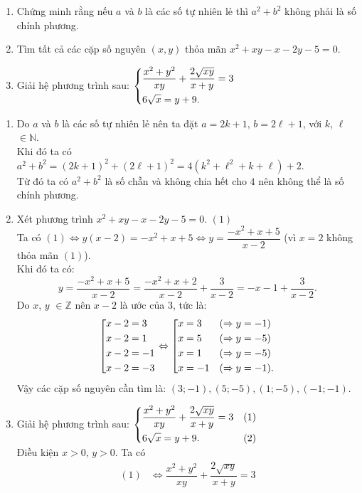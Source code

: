 \begin{ex}%
\hfill
    \begin{enumerate}    
        \item Chứng minh rằng nếu $a$ và $b$ là các số tự nhiên lẻ thì $a^2+b^2$ không phải là số chính phương.
        \item Tìm tất cả các cặp số nguyên $(x,y)$ thỏa mãn $x^2+xy-x-2y-5=0$.
        \item Giải hệ phương trình sau: $\left\{\begin{aligned}&\dfrac{x^2+y^2}{xy}+\dfrac{2\sqrt{xy}}{x+y}=3\\&6\sqrt{x}=y+9.\end{aligned}\right.$
    \end{enumerate}
\loigiai
    {\begin{enumerate}    
    		\item Do $a$ và $b$ là các số tự nhiên lẻ nên ta đặt $a=2k+1$, $b=2\ell+1$, với $k$, $\ell$ $\in\mathbb{N}$.\\
    		Khi đó ta có $a^2+b^2=(2k+1)^2+(2\ell+1)^2=4(k^2+\ell^2+k+\ell)+2$.\\
    		Từ đó ta có $a^2+b^2$ là số chẵn và không chia hết cho $4$ nên không thể là số chính phương.
    		\item Xét phương trình $x^2+xy-x-2y-5=0$. \hfill $(1)$\\
    		Ta có $(1)\Leftrightarrow y(x-2)=-x^2+x+5\Leftrightarrow y=\dfrac{-x^2+x+5}{x-2}$ (vì $x=2$ không thỏa mãn $(1)$).\\
    		Khi đó ta có: $$y=\dfrac{-x^2+x+5}{x-2}=\dfrac{-x^2+x+2}{x-2}+\dfrac{3}{x-2}=-x-1+\dfrac{3}{x-2}.$$
    		Do $x$, $y$ $\in\mathbb{Z}$ nên $x-2$ là ước của $3$, tức là:\\
    		$$\left[\begin{aligned}&x-2=3\\&x-2=1\\&x-2=-1\\&x-2=-3\end{aligned}\right.\Leftrightarrow\left[\begin{aligned}&x=3&&(\Rightarrow y=-1)\\&x=5&&(\Rightarrow y=-5)\\&x=1&&(\Rightarrow y=-5)\\&x=-1&&(\Rightarrow y=-1).\end{aligned}\right.$$
    		Vậy các cặp số nguyên cần tìm là: $(3; -1), (5; -5), (1; -5), (-1; -1)$.
    		\item Giải hệ phương trình sau: $\left\{\begin{aligned}&\dfrac{x^2+y^2}{xy}+\dfrac{2\sqrt{xy}}{x+y}=3&(1)\\&6\sqrt{x}=y+9.&(2)\end{aligned}\right.$\\
    		Điều kiện $x>0$, $y>0$.
    		Ta có
    		{\allowdisplaybreaks
    		\begin{align*}
    		(1)&\Leftrightarrow\dfrac{x^2+y^2}{xy}+\dfrac{2\sqrt{xy}}{x+y}=3\\

\end{align*}}
\end{enumerate}}
\end{ex}
